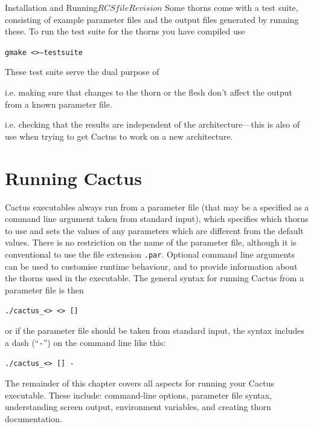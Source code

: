 \begin{cactuspart}{Installation and Running}{$RCSfile$}{$Revision$}
Some thorns come with a test suite, consisting of example parameter files
and the output files generated by running these. To run the test suite
for the thorns you have compiled use

\texttt{gmake <>--testsuite}

These test suite serve the dual purpose of

\begin{Lentry}
\item [Regression testing]
i.e. making sure that changes to the thorn or the flesh don't affect the
output from a known parameter file.
\item [Portability testing]
i.e. checking that the results are independent of the architecture---this
is also of use when trying to get Cactus to work on a new architecture.
\end{Lentry}


\chapter{Running Cactus}

Cactus executables always run from a parameter file (that may be a
specified as a command line argument taken from standard input), which
specifies which
thorns to use and sets the values of any parameters which are different
from the default values. There is no restriction on the name
of the parameter file, although it is conventional to use the file
extension \texttt{.par}.  Optional command line arguments can be used
to customise runtime behaviour, and to provide information about the
thorns used in the executable. The general syntax for running Cactus from
a parameter file is then

\texttt{./cactus\_<> <>
[]}

or if the parameter file should be taken from standard input, the syntax includes a dash (``\texttt{-}'') on the command line like this:

\texttt{./cactus\_<> [] -}

The remainder of this chapter covers all aspects for running your
Cactus executable.  These include: command-line options, parameter
file syntax, understanding screen output, environment variables, and
creating thorn documentation.


\end{cactuspart}
